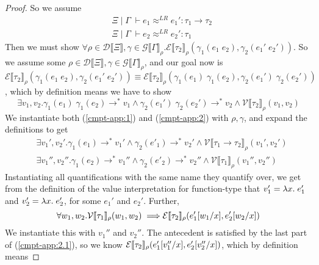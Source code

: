 \documentclass[a4paper, 11pt]{report}
\theoremstyle{definition}
\newcommand{\var}{x}
\newcommand{\expr}{e}
\newcommand{\val}{v}
\newcommand{\valB}{w}
\newcommand{\subst}[3]{#1{\left[#3 \middle/ #2 \right]}}
\newcommand{\Tfunc}[2]{#1 \rightarrow #2}
\newcommand{\typ}{\tau}
\newcommand{\venv}{\Gamma}
\newcommand{\tenv}{\Xi}
\newcommand{\jdgRel}[6]{#1 \; | \; #2 \; \vdash #3 \approx^{#4} #5 : #6}
\newcommand{\stepS}{\rightarrow^*}
\newcommand{\ValInp}[2]{\mathcal{V} \llbracket #1 \rrbracket_{#2}}
\newcommand{\ExpInp}[2]{\mathcal{E} \llbracket #1 \rrbracket_{#2}}
\newcommand{\VenvInp}[2]{\mathcal{G} \llbracket #1 \rrbracket_{#2}}
\newcommand{\TenvInp}[1]{\mathcal{D} \llbracket #1 \rrbracket}
\newcommand{\LogRel}[5]{\jdgRel{#1}{#2}{#3}{LR}{#4}{#5}}
\begin{document}
\begin{proof}
  So we assume
  \begin{align}
    &\LogRel{\tenv}{\venv}{\expr_1}{\expr_1'}{\Tfunc{\typ_1}{\typ_2}}\label{cmpt-app:1}\\
    &\LogRel{\tenv}{\venv}{\expr_2}{\expr_2'}{\typ_1}\label{cmpt-app:2}
  \end{align}
  Then we must show $\forall \rho \in \TenvInp{\tenv}, \gamma \in \VenvInp{\venv}{\rho} . \ExpInp{\typ_2}{\rho}(\gamma_1(\expr_1 \; \expr_2), \gamma_2(\expr_1' \; \expr_2'))$. So we assume some $\rho \in \TenvInp{\tenv}, \gamma \in \VenvInp{\venv}{\rho}$, and our goal now is $\ExpInp{\typ_2}{\rho}(\gamma_1(\expr_1 \; \expr_2), \gamma_2(\expr_1' \; \expr_2')) \equiv \ExpInp{\typ_2}{\rho}(\gamma_1(\expr_1) \; \gamma_1(\expr_2), \gamma_2(\expr_1') \; \gamma_2(\expr_2'))$, which by definition means we have to show
  \begin{equation}\label{cmpt-app:goal}
    \exists \val_1, \val_2 . \gamma_1(\expr_1) \; \gamma_1(\expr_2) \stepS \val_1 \land \gamma_2(\expr_1') \; \gamma_2(\expr_2') \stepS \val_2 \land \ValInp{\typ_2}{\rho}(\val_1, \val_2)
  \end{equation}
  We instantiate both (\ref*{cmpt-app:1}) and (\ref*{cmpt-app:2}) with $\rho, \gamma$, and expand the definitions to get
  \begin{align}
    &\exists \val_1', \val_2' . \gamma_1(\expr_1) \stepS \val_1' \land \gamma_2(\expr'_1) \stepS \val_2' \land \ValInp{\Tfunc{\typ_1}{\typ_2}}{\rho}(\val_1', \val_2')\label{cmpt-app:1.1}\\
    &\exists \val_1'', \val_2'' . \gamma_1(\expr_2) \stepS \val_1'' \land \gamma_2(\expr'_2) \stepS \val_2'' \land \ValInp{\typ_1}{\rho}(\val_1'', \val_2'')\label{cmpt-app:2.1}
  \end{align}
  Instantiating all quantifications with the same name they quantify over, we get from the definition of the value interpretation for function-type that
  $\val_1' = \fun \var . \expr_1'$ and $\val_2' = \fun \var . \expr_2'$, for some $\expr_1'$ and $\expr_2'$. Further,
  \begin{equation}
    \forall \valB_1, \valB_2 . \ValInp{\typ_1}{\rho}(\valB_{1}, \valB_{2}) \implies\\
    \ExpInp{\typ_2}{\rho}(\subst{\expr_1'}{\var}{\valB_1}, \subst{\expr_2'}{\var}{\valB_2})
  \end{equation}
  We instantiate this with $\val_1''$ and $\val_2''$. The antecedent is satisfied by the last part of (\ref*{cmpt-app:2.1}), so we know $\ExpInp{\typ_2}{\rho}(\subst{\expr_1'}{\var}{\val_1''}, \subst{\expr_2'}{\var}{\val_2''})$, which by definition means

\end{proof}
\end{document}
